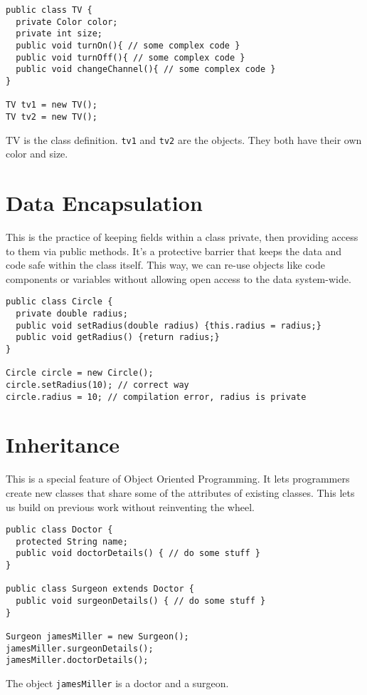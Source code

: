 \begin{lstlisting}
public class TV {
  private Color color;
  private int size;
  public void turnOn(){ // some complex code }
  public void turnOff(){ // some complex code }
  public void changeChannel(){ // some complex code }
}

TV tv1 = new TV();
TV tv2 = new TV();
\end{lstlisting}
TV is the class definition. \verb|tv1| and \verb|tv2| are the
objects. They both have their own color and size.

\section{Data Encapsulation}
This is the practice of keeping fields within a class private,
then providing access to them via public methods. It's a protective
barrier that keeps the data and code safe within the class itself.
This way, we can re-use objects like code components or variables
without allowing open access to the data system-wide.

\begin{lstlisting}
public class Circle {
  private double radius;
  public void setRadius(double radius) {this.radius = radius;}
  public void getRadius() {return radius;}
}

Circle circle = new Circle();
circle.setRadius(10); // correct way
circle.radius = 10; // compilation error, radius is private
\end{lstlisting}

\section{Inheritance}
This is a special feature of Object Oriented Programming.
It lets programmers create new classes that share some of the
attributes of existing classes. This lets us build on previous work
without reinventing the wheel.

\begin{lstlisting}
public class Doctor {
  protected String name;
  public void doctorDetails() { // do some stuff }
}

public class Surgeon extends Doctor {
  public void surgeonDetails() { // do some stuff }
}

Surgeon jamesMiller = new Surgeon();
jamesMiller.surgeonDetails();
jamesMiller.doctorDetails();
\end{lstlisting}

The object \verb|jamesMiller| is a doctor and a surgeon.

